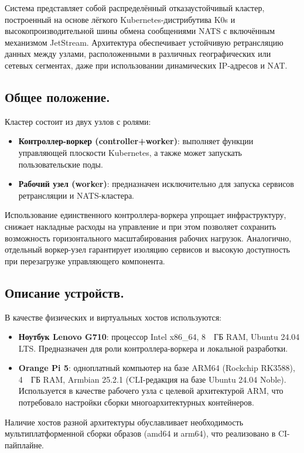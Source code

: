\documentclass[14pt, a4paper]{extreport}
\begin{document}
Система представляет собой распределённый отказаустойчивый кластер, построенный на основе лёгкого Kubernetes-дистрибутива K0s и высокопроизводительной шины обмена сообщениями NATS с
включённым механизмом JetStream. Архитектура обеспечивает устойчивую ретрансляцию данных между узлами, расположенными в различных географических или сетевых сегментах, даже при
использовании динамических IP-адресов и NAT.

\subsection{Общее положение.}

Кластер состоит из двух узлов с ролями:
\begin{itemize}
\item \textbf{Контроллер-воркер (controller+worker)}: выполняет функции управляющей плоскости Kubernetes, а также может запускать пользовательские поды.
\item \textbf{Рабочий узел (worker)}: предназначен исключительно для запуска сервисов ретрансляции и NATS-кластера.
\end{itemize}

Использование единственного контроллера-воркера упрощает инфраструктуру, снижает накладные расходы на управление и при этом позволяет сохранить возможность горизонтального масштабирования рабочих нагрузок. Аналогично, отдельный воркер-узел гарантирует изоляцию сервисов и высокую доступность при перезагрузке управляющего компонента.

\subsection{Описание устройств.}

В качестве физических и виртуальных хостов используются:
\begin{itemize}
\item \textbf{Ноутбук Lenovo G710}: процессор Intel x86\_64, 8~~ГБ RAM, Ubuntu 24.04 LTS. Предназначен для роли контроллера-воркера и локальной разработки.
\item \textbf{Orange Pi 5}: одноплатный компьютер на базе ARM64 (Rockchip RK3588), 4~~ГБ RAM, Armbian 25.2.1 (CLI-редакция на базе Ubuntu 24.04 Noble). Используется в качестве рабочего узла с целевой архитектурой ARM, что потребовало настройки сборки многоархитектурных контейнеров.
\end{itemize}

Наличие хостов разной архитектуры обуславливает необходимость мультиплатформенной сборки образов (amd64 и arm64), что реализовано в CI-пайплайне.
\end{document}
